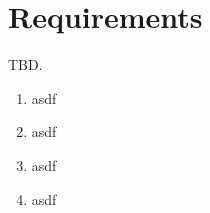 \chapter{Requirements}
TBD.

\begin{enumerate}[R1]
\item asdf
\item asdf
\item asdf
\item asdf
\end{enumerate}
